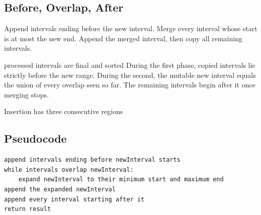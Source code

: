 \subsection{Before, Overlap, After}
Append intervals ending before the new interval. Merge every interval whose
start is at most the new end. Append the merged interval, then copy all
remaining intervals.

\begin{invariantbox}{processed intervals are final and sorted}
During the first phase, copied intervals lie strictly before the new range.
During the second, the mutable new interval equals the union of every overlap
seen so far. The remaining intervals begin after it once merging stops.
\end{invariantbox}

\begin{visualbox}{Insertion has three consecutive regions}
\centering
{}
\end{visualbox}

\subsection{Pseudocode}
\begin{lstlisting}[style=pseudocode]
append intervals ending before newInterval starts
while intervals overlap newInterval:
    expand newInterval to their minimum start and maximum end
append the expanded newInterval
append every interval starting after it
return result
\end{lstlisting}

